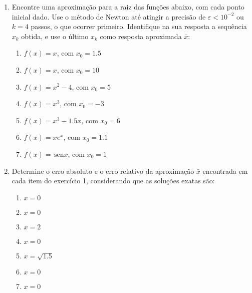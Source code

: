 \documentclass[a4paper]{article}
\providecommand{\sin}{} \renewcommand{\sin}{\hspace{2pt}\mathrm{sen}}
\begin{document}
\begin{enumerate}
\item Encontre uma aproximação para a raiz das funções abaixo, com
  cada ponto inicial dado. Use o método de Newton até atingir a
  precisão de $\varepsilon<10^{-2}$ ou $k=4$ passos, o que ocorrer
  primeiro. Identifique na sua resposta a sequência $x_k$ obtida, e
  use o último $x_k$ como resposta aproximada $\bar{x}$:

  \begin{enumerate}
  \item $f(x) = x$, com $x_0 = 1.5$
  \item $f(x) = x$, com $x_0 = 10$
  \item $f(x) = x^2 - 4$, com $x_0 = 5$
  \item $f(x) = x^3$, com $x_0 = -3$
  \item $f(x) = x^3-1.5x$, com $x_0 = 6$
  \item $f(x) = x e^x$, com $x_0 = 1.1$
  \item $f(x) = \sin x$, com $x_0 = 1$
  \end{enumerate}

\item Determine o erro absoluto e o erro relativo da aproximação
  $\bar{x}$ encontrada em cada item do exercício 1, considerando que
  as soluções exatas são:
  \begin{enumerate}
  \item $x=0$ %
  \item $x=0$ %
  \item $x=2$ %
  \item $x=0$ %
  \item $x=\sqrt{1.5}$ %
  \item $x=0$ %
  \item $x=0$ %
  \end{enumerate}


\end{enumerate}
\end{document}
